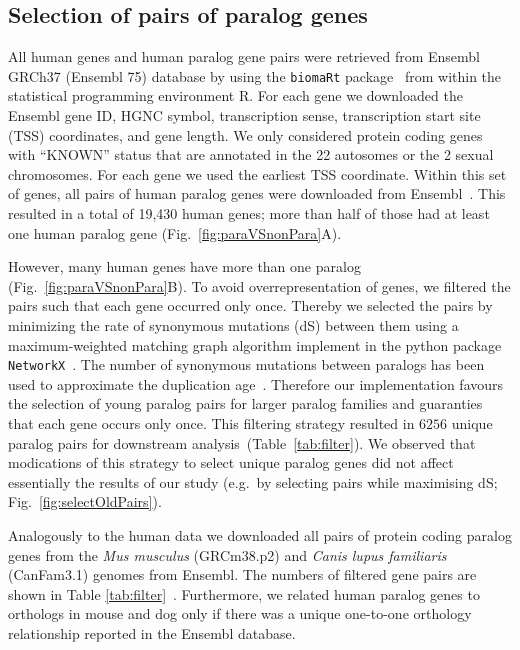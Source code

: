 \documentclass[a4paper,twoside=true,openright,parskip=full,chapterprefix=true,11pt,headings=normal,bibliography=totoc,listof=totoc,titlepage=on,captions=tableabove,draft=false]{scrreprt}
\theoremstyle{definition}
\theoremstyle{definition}
\theoremstyle{definition}
\theoremstyle{remark}
\begin{document}
\subsection{Selection of pairs of paralog
genes}\label{selection-of-pairs-of-paralog-genes}

All human genes and human paralog gene pairs were retrieved from Ensembl
GRCh37 (Ensembl 75) database by using the \texttt{biomaRt}
package~\citep{Durinck2009b, Durinck2005} from within the statistical
programming environment R. For each gene we downloaded the Ensembl gene
ID, HGNC symbol, transcription sense, transcription start site (TSS)
coordinates, and gene length. We only considered protein coding genes
with ``KNOWN'' status that are annotated in the 22 autosomes or the 2
sexual chromosomes. For each gene we used the earliest TSS coordinate.
Within this set of genes, all pairs of human paralog genes were
downloaded from Ensembl~\citep{Vilella2009}. This resulted in a total of
19,430 human genes; more than half of those had at least one human
paralog gene (Fig.~\ref{fig:paraVSnonPara}A).

However, many human genes have more than one paralog
(Fig.~\ref{fig:paraVSnonPara}B). To avoid overrepresentation of genes,
we filtered the pairs such that each gene occurred only once. Thereby we
selected the pairs by minimizing the rate of synonymous mutations (dS)
between them using a maximum-weighted matching graph algorithm implement
in the python package \texttt{NetworkX}~\citep{Galil1986}. The number of
synonymous mutations between paralogs has been used to approximate the
duplication age~\citep{Lan2016}. Therefore our implementation favours
the selection of young paralog pairs for larger paralog families and
guaranties that each gene occurs only once. This filtering strategy
resulted in \(6256\) unique paralog pairs for downstream
analysis~(Table~\ref{tab:filter}). We observed that modications of this
strategy to select unique paralog genes did not affect essentially the
results of our study (e.g.~by selecting pairs while maximising dS;
Fig.~\ref{fig:selectOldPairs}).

Analogously to the human data we downloaded all pairs of protein coding
paralog genes from the \emph{Mus musculus} (GRCm38.p2) and \emph{Canis
lupus familiaris} (CanFam3.1) genomes from Ensembl. The numbers of
filtered gene pairs are shown in Table \ref{tab:filter}~. Furthermore,
we related human paralog genes to orthologs in mouse and dog only if
there was a unique one-to-one orthology relationship reported in the
Ensembl database.
\end{document}
